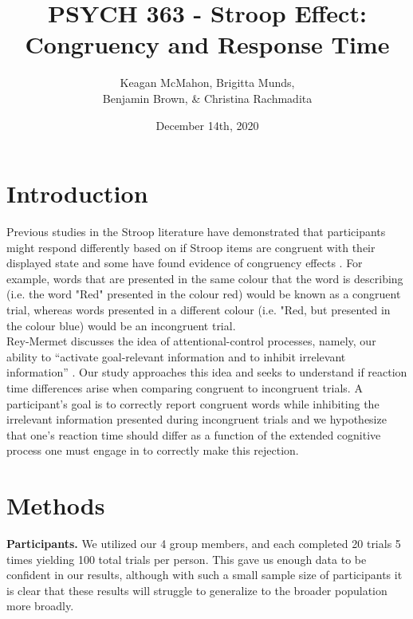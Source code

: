 \documentclass{article}
\author{Keagan McMahon, Brigitta Munds, \\ Benjamin Brown, \& Christina Rachmadita}
\date{December 14th, 2020}
\title{PSYCH 363 - Stroop Effect: Congruency and Response Time}
\begin{document}
\maketitle
\tableofcontents



\section{Introduction}
\label{sec:org192ad10}

\hspace{1em} Previous studies in the Stroop literature have demonstrated that participants might respond differently based on if Stroop items are congruent with their displayed state and some have found evidence of congruency effects \cite{SpinelliGiacomo2020WMLD}. For example, words that are presented in the same colour that the word is describing (i.e. the word "Red" presented in the colour red) would be known as a congruent trial, whereas words presented in a different colour (i.e. "Red, but presented in the colour blue) would be an incongruent trial.\\

Rey-Mermet discusses the idea of attentional-control processes, namely, our ability to ``activate goal-relevant information and to inhibit irrelevant information'' \cite{Mermet2020Faib}. Our study approaches this idea and seeks to understand if reaction time differences arise when comparing congruent to incongruent trials. A participant's goal is to correctly report congruent words while inhibiting the irrelevant information presented during incongruent trials and we hypothesize that one's reaction time should differ as a function of the extended cognitive process one must engage in to correctly make this rejection.

\section{Methods}
\label{sec:org80fd2ba}

\hspace{1em} \textbf{Participants.} We utilized our 4 group members, and each completed 20 trials 5 times yielding 100 total trials per person. This gave us enough data to be confident in our results, although with such a small sample size of participants it is clear that these results will struggle to generalize to the broader population more broadly. \\
\end{document}
